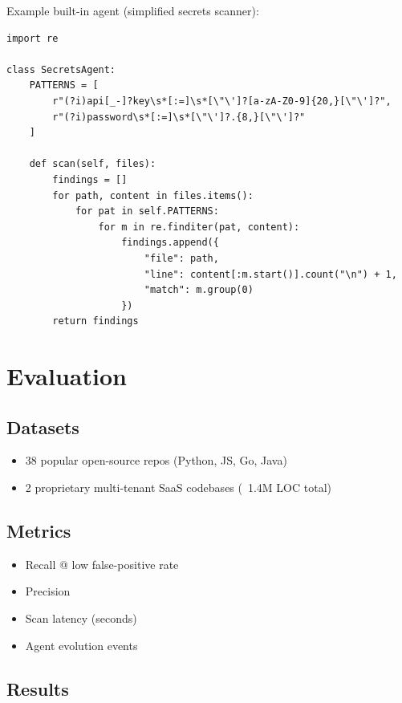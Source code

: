 \documentclass[10pt,a4paper]{article}
\begin{document}
Example built-in agent (simplified secrets scanner):

\begin{lstlisting}[caption={Basic hardcoded secrets agent}]
import re

class SecretsAgent:
    PATTERNS = [
        r"(?i)api[_-]?key\s*[:=]\s*[\"\']?[a-zA-Z0-9]{20,}[\"\']?",
        r"(?i)password\s*[:=]\s*[\"\']?.{8,}[\"\']?"
    ]

    def scan(self, files):
        findings = []
        for path, content in files.items():
            for pat in self.PATTERNS:
                for m in re.finditer(pat, content):
                    findings.append({
                        "file": path,
                        "line": content[:m.start()].count("\n") + 1,
                        "match": m.group(0)
                    })
        return findings
\end{lstlisting}

\section{Evaluation}

\subsection{Datasets}

\begin{itemize}
    \item 38 popular open-source repos (Python, JS, Go, Java)
    \item 2 proprietary multi-tenant SaaS codebases (~1.4M LOC total)
\end{itemize}

\subsection{Metrics}

\begin{itemize}
    \item Recall @ low false-positive rate
    \item Precision
    \item Scan latency (seconds)
    \item Agent evolution events
\end{itemize}

\subsection{Results}
\end{document}
